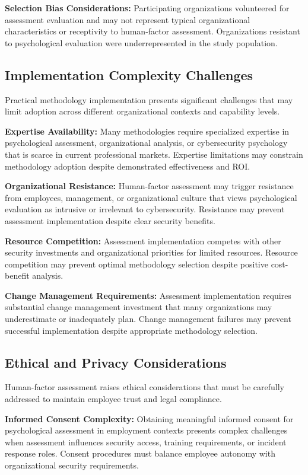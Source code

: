 \documentclass[10pt, twocolumn]{article}
\begin{document}
\textbf{Selection Bias Considerations:} Participating organizations volunteered for assessment evaluation and may not represent typical organizational characteristics or receptivity to human-factor assessment. Organizations resistant to psychological evaluation were underrepresented in the study population.

\subsection{Implementation Complexity Challenges}

Practical methodology implementation presents significant challenges that may limit adoption across different organizational contexts and capability levels.

\textbf{Expertise Availability:} Many methodologies require specialized expertise in psychological assessment, organizational analysis, or cybersecurity psychology that is scarce in current professional markets. Expertise limitations may constrain methodology adoption despite demonstrated effectiveness and ROI.

\textbf{Organizational Resistance:} Human-factor assessment may trigger resistance from employees, management, or organizational culture that views psychological evaluation as intrusive or irrelevant to cybersecurity. Resistance may prevent assessment implementation despite clear security benefits.

\textbf{Resource Competition:} Assessment implementation competes with other security investments and organizational priorities for limited resources. Resource competition may prevent optimal methodology selection despite positive cost-benefit analysis.

\textbf{Change Management Requirements:} Assessment implementation requires substantial change management investment that many organizations may underestimate or inadequately plan. Change management failures may prevent successful implementation despite appropriate methodology selection.

\subsection{Ethical and Privacy Considerations}

Human-factor assessment raises ethical considerations that must be carefully addressed to maintain employee trust and legal compliance.

\textbf{Informed Consent Complexity:} Obtaining meaningful informed consent for psychological assessment in employment contexts presents complex challenges when assessment influences security access, training requirements, or incident response roles. Consent procedures must balance employee autonomy with organizational security requirements.
\end{document}
